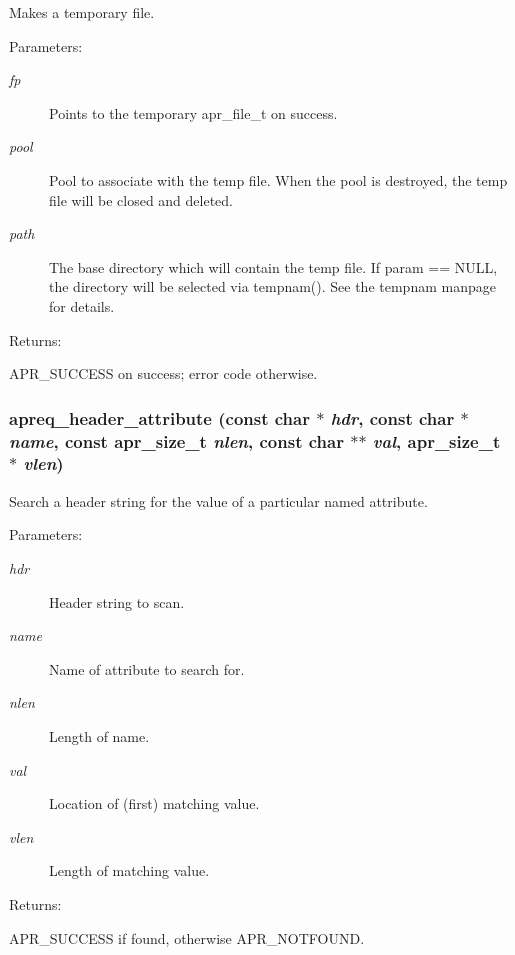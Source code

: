Makes a temporary file. \begin{Desc}
\item[Parameters: ]\par
\begin{description}
\item[{\em 
fp}]Points to the temporary apr\_\-file\_\-t on success. \item[{\em 
pool}]Pool to associate with the temp file. When the pool is destroyed, the temp file will be closed and deleted. \item[{\em 
path}]The base directory which will contain the temp file. If param == NULL, the directory will be selected via tempnam(). See the tempnam manpage for details. \end{description}
\end{Desc}
\begin{Desc}
\item[Returns: ]\par
APR\_\-SUCCESS on success; error code otherwise. \end{Desc}
\subsubsection{ apreq\_\-header\_\-attribute (const char $\ast$ {\em hdr}, const char $\ast$ {\em name}, const {\bf apr\_\-size\_\-t} {\em nlen}, const char $\ast$$\ast$ {\em val}, {\bf apr\_\-size\_\-t} $\ast$ {\em vlen})}\label{group__Utils_a23}


Search a header string for the value of a particular named attribute. \begin{Desc}
\item[Parameters: ]\par
\begin{description}
\item[{\em 
hdr}]Header string to scan. \item[{\em 
name}]Name of attribute to search for. \item[{\em 
nlen}]Length of name. \item[{\em 
val}]Location of (first) matching value. \item[{\em 
vlen}]Length of matching value. \end{description}
\end{Desc}
\begin{Desc}
\item[Returns: ]\par
APR\_\-SUCCESS if found, otherwise APR\_\-NOTFOUND. \end{Desc}
